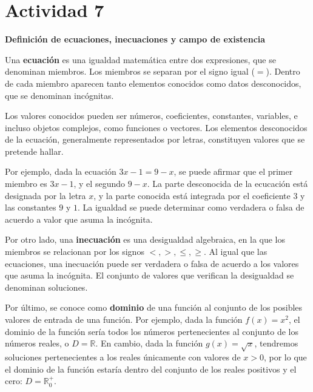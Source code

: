 \section*{Actividad 7}
\textbf{Definición de ecuaciones, inecuaciones y campo de existencia}

Una \textbf{ecuación} es una igualdad matemática entre dos expresiones, que se denominan miembros. Los miembros se separan por el signo igual ($=$). Dentro de cada miembro aparecen tanto elementos conocidos como datos desconocidos, que se denominan incógnitas. 

Los valores conocidos pueden ser números, coeficientes, constantes, variables, e incluso objetos complejos, como funciones o vectores. Los elementos desconocidos de la ecuación, generalmente representados por letras, constituyen valores que se pretende hallar. 

Por ejemplo, dada la ecuación $3x - 1 = 9 - x$, se puede afirmar que el primer miembro es $3x - 1$, y el segundo $9 - x$. La parte desconocida de la ecucación está designada por la letra $x$, y la parte conocida está integrada por el coeficiente $3$ y las constantes $9$ y $1$. La igualdad se puede determinar como verdadera o falsa de acuerdo a valor que asuma la incógnita. 

Por otro lado, una \textbf{inecuación} es una desigualdad algebraica, en la que los miembros se relacionan por los signos $<,>,\leq, \geq$. Al igual que las ecuaciones, una inecuación puede ser verdadera o falsa de acuerdo a los valores que asuma la incógnita. El conjunto de valores que verifican la desigualdad se denominan soluciones.

Por último, se conoce como \textbf{dominio} de una función al conjunto de los posibles valores de entrada de una función. Por ejemplo, dada la función $f(x)=x^{2}$, el dominio de la función sería todos los números pertenecientes al conjunto de los números reales, o $D=\mathbb{R}$. En cambio, dada la función $g(x)=\sqrt{x}$, tendremos soluciones pertenecientes a los reales únicamente con valores de $x > 0$, por lo que el dominio de la función estaría dentro del conjunto de los reales positivos y el cero: $D=\mathbb{R}^{+}_{0}$.
